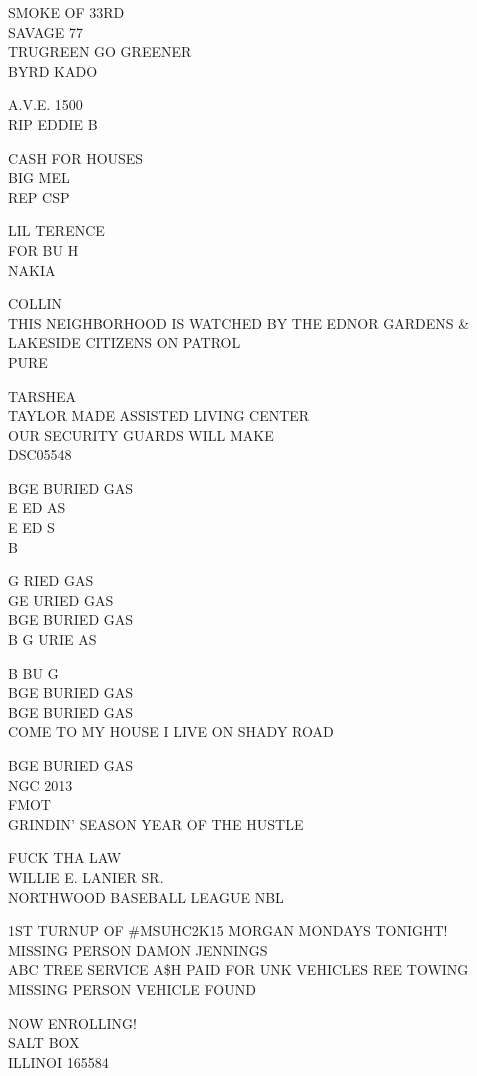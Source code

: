 \documentclass[10pt,letterpaper]{article}
\begin{document}
SMOKE OF 33RD\\
SAVAGE 77\\
TRUGREEN GO GREENER\\
BYRD KADO

A.V.E. 1500\\
RIP EDDIE B

CASH FOR HOUSES\\
BIG MEL\\
REP CSP

LIL TERENCE\\
FOR BU H\\
NAKIA

COLLIN\\
THIS NEIGHBORHOOD IS WATCHED BY THE EDNOR GARDENS \& LAKESIDE CITIZENS ON PATROL\\
PURE

TARSHEA\\
TAYLOR MADE ASSISTED LIVING CENTER\\
OUR SECURITY GUARDS WILL MAKE\\
DSC05548

BGE BURIED GAS\\
E ED AS\\
E ED S\\
B

G RIED GAS\\
GE URIED GAS\\
BGE BURIED GAS\\
B G URIE AS

B BU G\\
BGE BURIED GAS\\
BGE BURIED GAS\\
COME TO MY HOUSE I LIVE ON SHADY ROAD

BGE BURIED GAS\\
NGC 2013\\
FMOT\\
GRINDIN' SEASON YEAR OF THE HUSTLE

FUCK THA LAW\\
WILLIE E. LANIER SR.\\
NORTHWOOD BASEBALL LEAGUE NBL

1ST TURNUP OF \#MSUHC2K15 MORGAN MONDAYS TONIGHT!\\
MISSING PERSON DAMON JENNINGS\\
ABC TREE SERVICE A\$H PAID FOR UNK VEHICLES REE TOWING\\
MISSING PERSON VEHICLE FOUND

NOW ENROLLING!\\
SALT BOX\\
ILLINOI 165584
\end{document}
